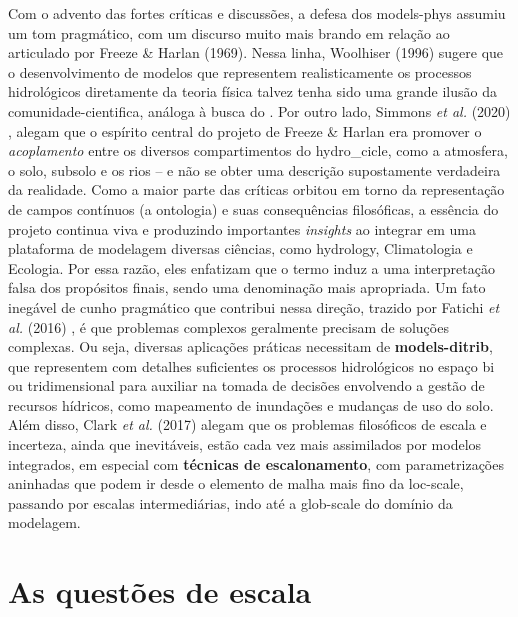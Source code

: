 \documentclass[./main.tex]{subfiles}
\begin{document}
\par Com o advento das fortes críticas e discussões, a defesa dos \gls{models-phys} assumiu um tom pragmático, com um discurso muito mais brando em relação ao articulado por Freeze \& Harlan (1969). Nessa linha, Woolhiser (1996) \cite{Woolhiser1996a} sugere que o desenvolvimento de modelos que representem realisticamente os processos hidrológicos diretamente da \gls{teoria} física talvez tenha sido uma grande ilusão da \gls{comunidade-cientifica}, análoga à busca do . Por outro lado, Simmons \textit{et al.} (2020) \cite{Simmons2020a}, alegam que o espírito central do projeto de Freeze \& Harlan era promover o \textit{acoplamento} entre os diversos compartimentos do \gls{hydro_cicle}, como a atmosfera, o solo, subsolo e os rios -- e não se obter uma descrição supostamente verdadeira da realidade. Como a maior parte das críticas orbitou em torno da representação de campos contínuos (a ontologia) e suas consequências filosóficas, a essência do projeto continua viva e produzindo importantes \textit{insights} ao integrar em uma plataforma de modelagem diversas ciências, como \gls{hydrology}, Climatologia e Ecologia. Por essa razão, eles enfatizam que o termo  induz a uma interpretação falsa dos propósitos finais, sendo  uma denominação mais apropriada. Um fato inegável de cunho pragmático que contribui nessa direção, trazido por Fatichi \textit{et al.} (2016) \cite{Fatichi2016a}, é que problemas complexos geralmente precisam de soluções complexas. Ou seja, diversas aplicações práticas necessitam de \textbf{\gls{models-ditrib}}, que representem com detalhes suficientes os processos hidrológicos no espaço bi ou tridimensional para auxiliar na tomada de decisões envolvendo a gestão de recursos hídricos, como mapeamento de inundações e mudanças de uso do solo. Além disso, Clark \textit{et al.} (2017) \cite{Clark2017a} alegam que os problemas filosóficos de escala e incerteza, ainda que inevitáveis, estão cada vez mais assimilados por modelos integrados, em especial com \textbf{técnicas de escalonamento}, com parametrizações aninhadas que podem ir desde o elemento de malha mais fino da \gls{loc-scale}, passando por escalas intermediárias, indo até a \gls{glob-scale} do domínio da modelagem.
 
\section{As questões de escala} \label{sec:hydro:sim}
\end{document}
